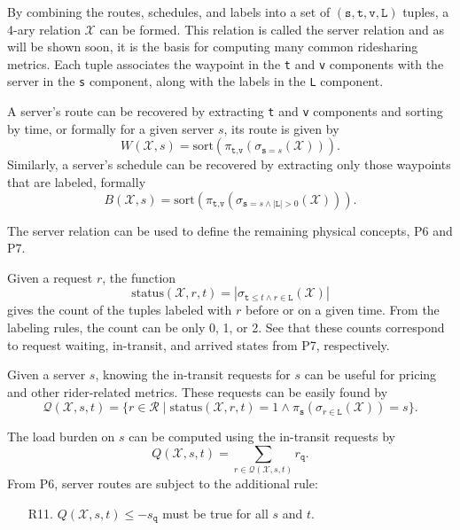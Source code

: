 By combining the routes, schedules, and labels into
a set of $(\texttt{s},\texttt{t},\texttt{v},\texttt{L})$ tuples, a
4-ary relation $\mathcal{X}$ can be formed. This relation is called the
server relation and as will be shown soon, it is the basis for computing many common ridesharing metrics.
Each tuple associates the waypoint in the \texttt{t} and \texttt{v} components with the server
in the \texttt{s} component, along with the labels in the \texttt{L} component.

A server's route can be recovered by extracting \texttt{t} and \texttt{v}
components and sorting by time, or formally for a given server $s$, its route
is given by
$$W(\mathcal{X},s)=\textrm{sort}(\pi_{\texttt{t},\texttt{v}}(\sigma_{\texttt{s}=s}(\mathcal{X}))).$$
Similarly, a server's schedule can be recovered by
extracting only those waypoints that are labeled, formally
$$B(\mathcal{X},s)=\textrm{sort}(\pi_{\texttt{t},\texttt{v}}(\sigma_{\texttt{s}=s\land |\texttt{L}|>0}(\mathcal{X}))).$$

The server relation can be used to define the remaining physical concepts, P6 and P7.

Given a request $r$, the function
\begin{equation}
\label{eq:status}
\textrm{status}(\mathcal{X},r,t)=|\sigma_{\texttt{t}\leq t\land
r\in\texttt{L}}(\mathcal{X})|
\end{equation}
gives the count of the tuples labeled with $r$
before or on a given time. From the labeling rules, the count can be only 0, 1,
or 2. See that these counts correspond to request waiting, in-transit, and arrived states
from P7, respectively.

Given a server $s$, knowing the in-transit requests for $s$ can be useful for
pricing and other rider-related
metrics. %
These requests can be easily found by
$$\mathcal{Q}(\mathcal{X},s,t)=\{r\in\mathcal{R}\mid\textrm{status}(\mathcal{X},r,t)=1
\land\pi_\texttt{s}(\sigma_{r\in\texttt{L}}(\mathcal{X}))=s\}.$$

The load burden on $s$ can be computed using the in-transit requests by
\begin{equation}
\label{eq:load}
Q(\mathcal{X},s,t)=\sum_{r\in\mathcal{Q}(\mathcal{X},s,t)}r_\texttt{q}.
\end{equation}
From P6, server routes are subject to the additional rule:
\begin{enumerate}
\item[R11.] $Q(\mathcal{X},s,t)\leq -s_\texttt{q}$ must be true for all $s$ and $t$.
\end{enumerate}

